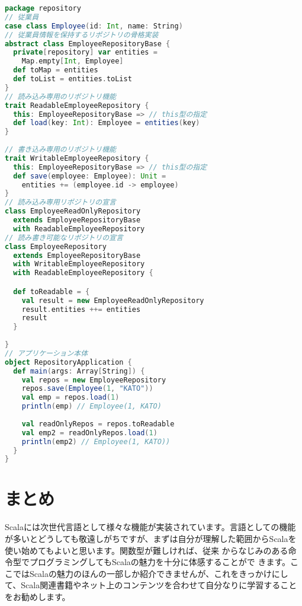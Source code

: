 \begin{lstlisting}[language=scala, label=src:trait_mixin, caption=複数のトレイトを使ったミックスインの例]
package repository
// 従業員
case class Employee(id: Int, name: String)
// 従業員情報を保持するリポジトリの骨格実装
abstract class EmployeeRepositoryBase {
  private[repository] var entities =
    Map.empty[Int, Employee]
  def toMap = entities
  def toList = entities.toList
}
// 読み込み専用のリポジトリ機能
trait ReadableEmployeeRepository {
  this: EmployeeRepositoryBase => // this型の指定
  def load(key: Int): Employee = entities(key)
}
  
// 書き込み専用のリポジトリ機能
trait WritableEmployeeRepository {
  this: EmployeeRepositoryBase => // this型の指定
  def save(employee: Employee): Unit =
    entities += (employee.id -> employee)
}
// 読み込み専用リポジトリの宣言
class EmployeeReadOnlyRepository
  extends EmployeeRepositoryBase
  with ReadableEmployeeRepository
// 読み書き可能なリポジトリの宣言
class EmployeeRepository
  extends EmployeeRepositoryBase
  with WritableEmployeeRepository
  with ReadableEmployeeRepository {

  def toReadable = {
    val result = new EmployeeReadOnlyRepository
    result.entities ++= entities
    result
  }
   
}
// アプリケーション本体
object RepositoryApplication {
  def main(args: Array[String]) {
    val repos = new EmployeeRepository
    repos.save(Employee(1, "KATO"))
    val emp = repos.load(1)
    println(emp) // Employee(1, KATO)
     
    val readOnlyRepos = repos.toReadable
    val emp2 = readOnlyRepos.load(1)
    println(emp2) // Employee(1, KATO))
  }
} 
\end{lstlisting}

\part{まとめ}
Scalaには次世代言語として様々な機能が実装されています。言語としての機能が多いとどうしても敬遠しがちですが、まずは自分が理解した範囲からScalaを使い始めてもよいと思います。関数型が難しければ、従来 からなじみのある命令型でプログラミングしてもScalaの魅力を十分に体感することがで きます。ここではScalaの魅力のほんの一部しか紹介できませんが、これをきっかけにして、Scala関連書籍やネット上のコンテンツを合わせて自分なりに学習することをお勧めします。
